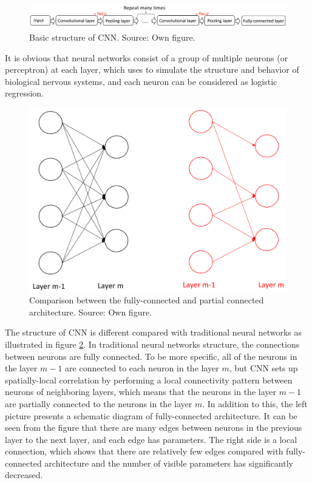 \documentclass[]{krantz}
\begin{document}
\begin{figure}[h]
\includegraphics[width=1.05\linewidth]{figures/01-00-deep-learning-for-nlp/01_03_basic_structure} \caption{Basic structure of CNN. Source: Own figure.}\label{fig:figintro1}
\end{figure}

It is obvious that neural networks consist of a group of multiple neurons (or perceptron) at each layer, which uses to simulate the structure and behavior of biological nervous systems, and each neuron can be considered as logistic regression.

\begin{figure}[h]

{\centering \includegraphics[width=0.5\linewidth]{figures/01-00-deep-learning-for-nlp/01_03_Comparison_Fully_Partial} 

}

\caption{Comparison between the fully-connected and partial connected architecture. Source: Own figure.}\label{fig:figintro2}
\end{figure}

The structure of CNN is different compared with traditional neural networks as illustrated in figure \ref{fig:figintro2}. In traditional neural networks structure, the connections between neurons are fully connected. To be more specific, all of the neurons in the layer \(m-1\) are connected to each neuron in the layer \(m\), but CNN sets up spatially-local correlation by performing a local connectivity pattern between neurons of neighboring layers, which means that the neurons in the layer \(m-1\) are partially connected to the neurons in the layer \(m\). In addition to this, the left picture presents a schematic diagram of fully-connected architecture. It can be seen from the figure that there are many edges between neurons in the previous layer to the next layer, and each edge has parameters. The right side is a local connection, which shows that there are relatively few edges compared with fully-connected architecture and the number of visible parameters has significantly decreased.
\end{document}
